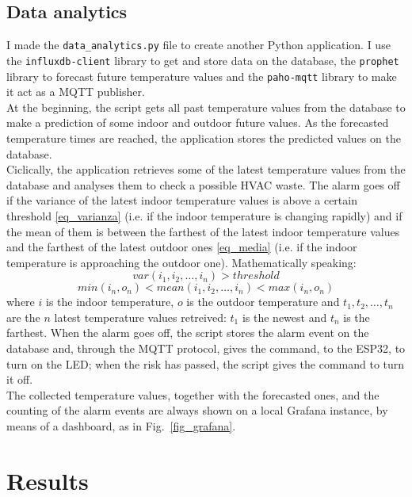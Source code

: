 \documentclass[conference]{IEEEtran}
\begin{document}
\subsection{Data analytics}
I made the \texttt{data\_analytics.py} file to create another Python application. I use the \texttt{influxdb-client} library to get and store data on the database, the \texttt{prophet} library to forecast future temperature values and the \texttt{paho-mqtt} library to make it act as a MQTT publisher.\\
At the beginning, the script gets all past temperature values from the database to make a prediction of some indoor and outdoor future values. As the forecasted temperature times are reached, the application stores the predicted values on the database.\\
Ciclically, the application retrieves some of the latest temperature values from the database and analyses them to check a possible HVAC waste. The alarm goes off if the variance of the latest indoor temperature values is above a certain threshold \eqref{eq_varianza} (i.e. if the indoor temperature is changing rapidly) and if the mean of them is between the farthest of the latest indoor temperature values and the farthest of the latest outdoor ones \eqref{eq_media} (i.e. if the indoor temperature is approaching the outdoor one). Mathematically speaking:
\begin{equation}
var(i_1, i_2, \dots, i_n) > threshold \label{eq_varianza}
\end{equation}
\begin{equation}
min(i_n, o_n) < mean(i_1, i_2, \dots, i_n) < max(i_n, o_n) \label{eq_media}
\end{equation}
where $i$ is the indoor temperature, $o$ is the outdoor temperature and $t_1, t_2, \dots, t_n$ are the $n$ latest temperature values retreived: $t_1$ is the newest and $t_n$ is the farthest. When the alarm goes off, the script stores the alarm event on the database and, through the MQTT protocol, gives the command, to the ESP32, to turn on the LED; when the risk has passed, the script gives the command to turn it off.\\
The collected temperature values, together with the forecasted ones, and the counting of the alarm events are always shown on a local Grafana instance, by means of a dashboard, as in Fig.~\ref{fig_grafana}.


\section{Results}
\end{document}
